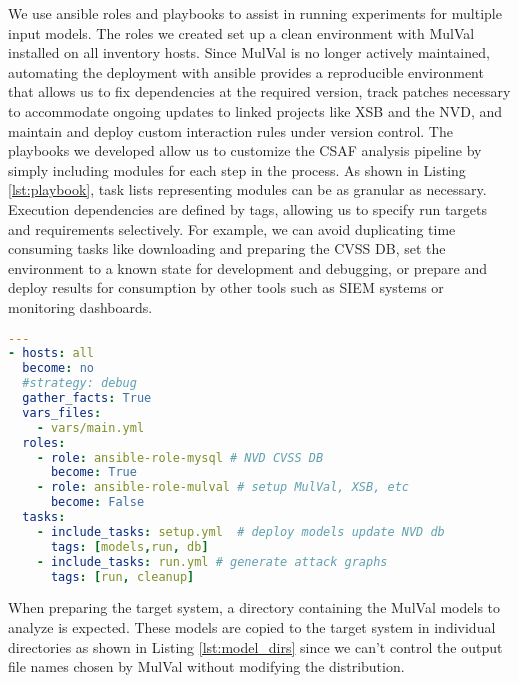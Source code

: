 We use ansible\cite{Hall:2013:ACM:2601666} roles and playbooks to assist in running experiments for multiple input models. The roles we created set up a clean environment with MulVal installed on all inventory hosts. Since MulVal is no longer actively maintained, automating the deployment with ansible provides a reproducible environment that allows us to fix dependencies at the required version, track patches necessary to accommodate ongoing updates to linked projects like XSB and the NVD, and maintain and deploy custom interaction rules under version control. The playbooks we developed allow us to customize the CSAF analysis pipeline by simply including modules for each step in the process. As shown in Listing \ref{lst:playbook}, task lists representing modules can be as granular as necessary. Execution dependencies are defined by tags, allowing us to specify run targets and requirements selectively. For example, we can avoid duplicating time consuming tasks like downloading and preparing the CVSS DB, set the environment to a known state for development and debugging, or prepare and deploy results for consumption by other tools such as SIEM systems or monitoring dashboards. 


\begin{minipage}{\linewidth}
\begin{lstlisting}[language=yaml, label={lst:playbook}, caption={Ansible CSAF play},captionpos=b, linewidth=.6\textwidth]
 ---
- hosts: all
  become: no
  #strategy: debug
  gather_facts: True
  vars_files:
    - vars/main.yml
  roles:
    - role: ansible-role-mysql # NVD CVSS DB
      become: True
    - role: ansible-role-mulval # setup MulVal, XSB, etc
      become: False
  tasks:
    - include_tasks: setup.yml  # deploy models update NVD db
      tags: [models,run, db]
    - include_tasks: run.yml # generate attack graphs
      tags: [run, cleanup]
\end{lstlisting}
\end{minipage}

When preparing the target system, a directory containing the MulVal models to analyze is expected. These models are copied to the target system in individual directories as shown in Listing \ref{lst:model_dirs} since we can't control the output file names chosen by MulVal without modifying the distribution. 

